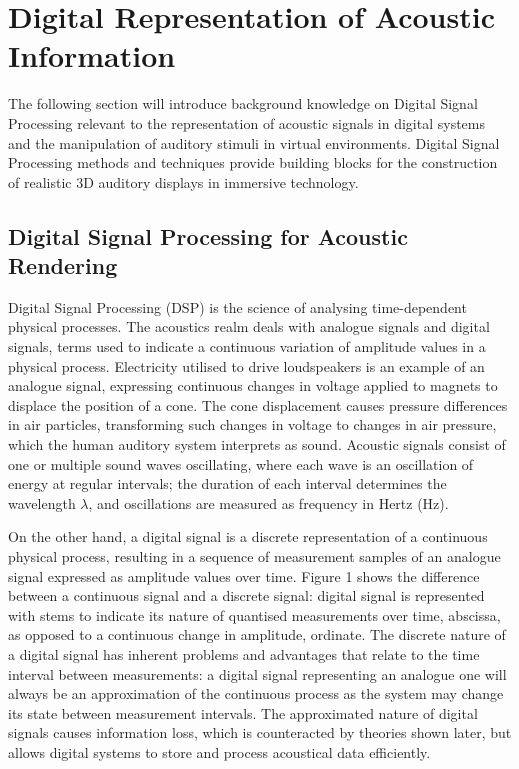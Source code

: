 \section{Digital Representation of Acoustic Information}
\label{sec:DSP-background}
The following section will introduce background knowledge on Digital Signal Processing relevant to the representation of acoustic signals in digital systems and the manipulation of auditory stimuli in virtual environments. Digital Signal Processing methods and techniques provide building blocks for the construction of realistic 3D auditory displays in immersive technology.

\subsection{Digital Signal Processing for Acoustic Rendering}
Digital Signal Processing (DSP) is the science of analysing time-dependent physical processes. The acoustics realm deals with analogue signals and digital signals, terms used to indicate a continuous variation of amplitude values in a physical process. Electricity utilised to drive loudspeakers is an example of an analogue signal, expressing continuous changes in voltage applied to magnets to displace the position of a cone. The cone displacement causes pressure differences in air particles, transforming such changes in voltage to changes in air pressure, which the human auditory system interprets as sound. Acoustic signals consist of one or multiple sound waves oscillating, where each wave is an oscillation of energy at regular intervals; the duration of each interval determines the wavelength $\lambda$, and oscillations are measured as frequency in Hertz (Hz). \par
On the other hand, a digital signal is a discrete representation of a continuous physical process, resulting in a sequence of measurement samples of an analogue signal expressed as amplitude values over time. Figure 1 shows the difference between a continuous signal and a discrete signal: digital signal is represented with stems to indicate its nature of quantised measurements over time, abscissa, as opposed to a continuous change in amplitude, ordinate. The discrete nature of a digital signal has inherent problems and advantages that relate to the time interval between measurements: a digital signal representing an analogue one will always be an approximation of the continuous process as the system may change its state between measurement intervals. The approximated nature of digital signals causes information loss, which is counteracted by theories shown later, but allows digital systems to store and process acoustical data efficiently.\par
